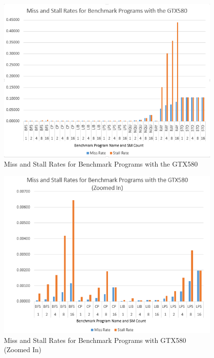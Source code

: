 \begin{figure}[b!]
\centering
\includegraphics[width=\columnwidth]{graphics/miss_stalls_benchmarks.png}
\caption{Miss and Stall Rates for Benchmark Programs with the GTX580
}
\label{fig:missStalls}
\end{figure}

\begin{figure}[b!]
\centering
\includegraphics[width=\columnwidth]{graphics/miss_stalls_benchmarks_zoomed.png}
\caption{Miss and Stall Rates for Benchmark Programs with GTX580 (Zoomed In) }
\label{fig:missStallsZoomed}
\end{figure}

